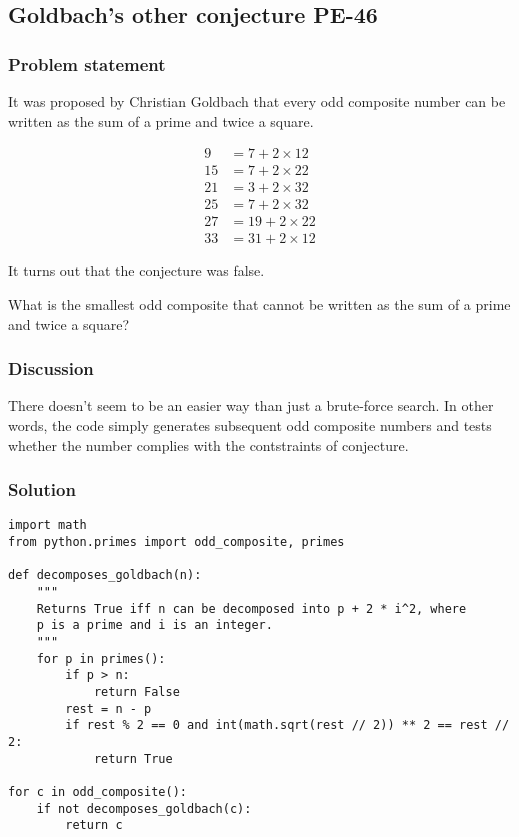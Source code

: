 \documentclass[11pt]{article}
\begin{document}
\subsection{Goldbach's other conjecture PE-46}
\label{sec:orgheadline9}
\subsubsection{Problem statement}
\label{sec:orgheadline6}
It was proposed by Christian Goldbach that every odd composite number can be
written as the sum of a prime and twice a square.

\begin{align*}
  9  &= 7  + 2 \times 12 \\
  15 &= 7  + 2 \times 22 \\
  21 &= 3  + 2 \times 32 \\
  25 &= 7  + 2 \times 32 \\
  27 &= 19 + 2 \times 22 \\
  33 &= 31 + 2 \times 12
\end{align*}


It turns out that the conjecture was false.

What is the smallest odd composite that cannot be written as the sum of a
prime and twice a square?

\subsubsection{Discussion}
\label{sec:orgheadline7}
There doesn't seem to be an easier way than just a brute-force search.  In
other words, the code simply generates subsequent odd composite numbers and
tests whether the number complies with the contstraints of conjecture.

\subsubsection{Solution}
\label{sec:orgheadline8}
\begin{verbatim}
import math
from python.primes import odd_composite, primes

def decomposes_goldbach(n):
    """
    Returns True iff n can be decomposed into p + 2 * i^2, where
    p is a prime and i is an integer.
    """
    for p in primes():
        if p > n:
            return False
        rest = n - p
        if rest % 2 == 0 and int(math.sqrt(rest // 2)) ** 2 == rest // 2:
            return True

for c in odd_composite():
    if not decomposes_goldbach(c):
        return c
\end{verbatim}
\end{document}
